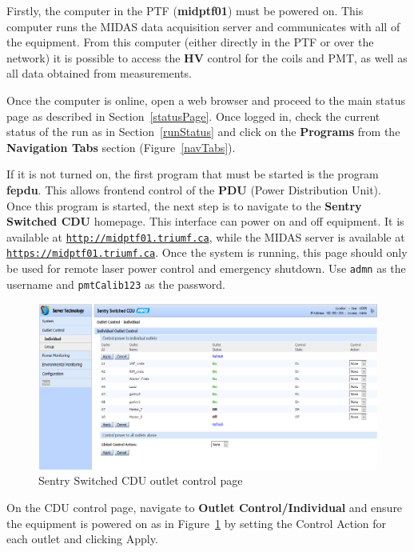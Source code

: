 \documentclass[twoside,letterpaper]{refart}
\begin{document}
Firstly, the computer in the PTF (\textbf{midptf01}) must be powered on. This computer runs the MIDAS data acquisition server and communicates with all of the equipment. From this computer (either directly in the PTF or over the network) it is possible to access the \textbf{HV} control for the coils and PMT, as well as all data obtained from measurements.

Once the computer is online, open a web browser and proceed to the main status page as described in Section~\ref{statusPage}. Once logged in, check the current status of the run as in Section~\ref{runStatus} and click on the \textbf{Programs} from the \textbf{Navigation Tabs} section (Figure~\ref{navTabs}).

If it is not turned on, the first program that must be started is the program \textbf{fepdu}. This allows frontend control of the \textbf{PDU} (Power Distribution Unit). Once this program is started, the next step is to navigate to the \textbf{Sentry Switched CDU} homepage. This interface can power on and off equipment. It is available at \href{http://midptf01.triumf.ca}{\texttt{http://midptf01.triumf.ca}}, while the MIDAS server is available at \href{https://midptf01.triumf.ca}{\texttt{https://midptf01.triumf.ca}}. Once the system is running, this page should only be used for remote laser power control and emergency shutdown. Use \texttt{admn} as the username and \texttt{pmtCalib123} as the password.

\begin{figure}[!htpb]\centering
	\includegraphics[width=\textwidth]{images/sentrySwitchedCDU.png}
	\caption{Sentry Switched CDU outlet control page\label{cdu}}
\end{figure}

On the CDU control page, navigate to \textbf{Outlet Control/Individual} and ensure the equipment is powered on as in Figure~\ref{cdu} by setting the Control Action for each outlet and clicking Apply.
\end{document}
